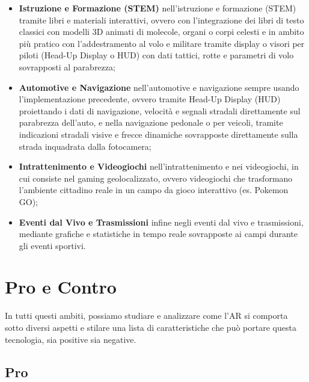 \begin{itemize}
     \item[-] \textbf{ Istruzione e Formazione (STEM)} \newline
    nell'istruzione e formazione (STEM) tramite libri e materiali interattivi, ovvero con l'integrazione dei libri di testo classici con modelli 3D animati di molecole, organi o corpi celesti e in ambito più pratico con l'addestramento al volo e militare tramite display o visori per piloti (Head-Up Display o HUD) con dati tattici, rotte e parametri di volo sovrapposti al parabrezza;

     \item[-] \textbf{Automotive e Navigazione} \newline
    nell'automotive e navigazione sempre usando l'implementazione precedente, ovvero tramite Head-Up Display (HUD) proiettando i dati di navigazione, velocità e segnali stradali direttamente sul parabrezza dell'auto, e nella navigazione pedonale o per veicoli, tramite indicazioni stradali visive e frecce dinamiche sovrapposte direttamente sulla strada inquadrata dalla fotocamera;
     
     \item[-] \textbf{ Intrattenimento e Videogiochi} \newline
    nell'intrattenimento e nei videogiochi, in cui consiste nel gaming geolocalizzato, ovvero videogiochi che trasformano l'ambiente cittadino reale in un campo da gioco interattivo (es. Pokemon GO);

     \item[-] \textbf{ Eventi dal Vivo e Trasmissioni} \newline
    infine negli eventi dal vivo e trasmissioni, mediante grafiche e statistiche in tempo reale sovrapposte ai campi durante gli eventi sportivi.
\end{itemize}

\section{ Pro e Contro }
In tutti questi ambiti, possiamo studiare e analizzare come l'AR si comporta sotto diversi aspetti e stilare una lista di caratteristiche che può portare questa tecnologia, sia positive sia negative.

\subsection{Pro}

